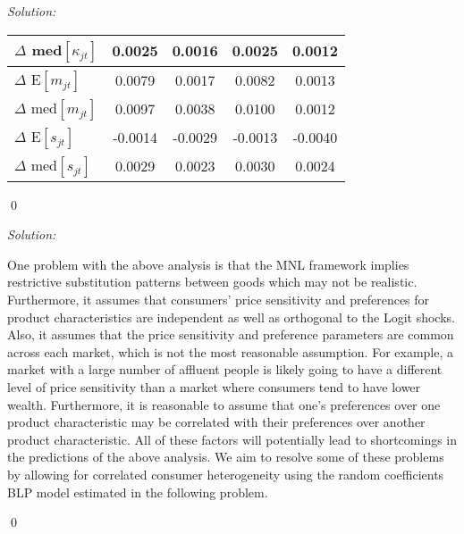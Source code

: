 \documentclass[12pt]{article}
\newenvironment{problem}[2][Problem]{\begin{trivlist}
\item[\hskip \labelsep {\bfseries #1}\hskip \labelsep {\bfseries #2.}]}{\end{trivlist}}
\newenvironment{sol}
    {\emph{Solution:}
    }
    {
    \qed
    }
\begin{document}
\begin{sol}
\begin{center}
\begin{table}[htbp]
\begin{tabular}{lcccc}
                $\Delta$ med$[\kappa_{jt}]$ &0.0025 &0.0016 &0.0025 &0.0012\\
                \midrule
                $\Delta$ E$[m_{jt}]$        &0.0079 &0.0017 &0.0082 &0.0013\\
                $\Delta$ med$[m_{jt}]$      &0.0097 &0.0038 &0.0100 &0.0012\\
                 \midrule
                $\Delta$  E$[s_{jt}]$      &-0.0014&-0.0029&-0.0013&-0.0040\\
                $\Delta$ med$[s_{jt}]$     &0.0029 &0.0023 &0.0030 &0.0024\\
              \bottomrule
          \end{tabular}
        \label{tab:gmq_merger}
      \end{table}
\end{center}
\end{sol}
\begin{problem}{4}
\end{problem}
\begin{sol}
One problem with the above analysis is that the MNL framework implies restrictive substitution patterns between goods which may not be realistic. Furthermore, it assumes that consumers' price sensitivity and preferences for product characteristics are independent as well as orthogonal to the Logit shocks. Also, it assumes that the price sensitivity and preference parameters are common across each market, which is not the most reasonable assumption. For example, a market with a large number of affluent people is likely going to have a different level of price sensitivity than a market where consumers tend to have lower wealth. Furthermore, it is reasonable to assume that one's preferences over one product characteristic may be correlated with their preferences over another product characteristic. All of these factors will potentially lead to shortcomings in the predictions of the above analysis. We aim to resolve some of these problems by allowing for correlated consumer heterogeneity using the random coefficients BLP model estimated in the following problem.
\end{sol}
\begin{problem}{5}
\end{problem}
\end{document}
